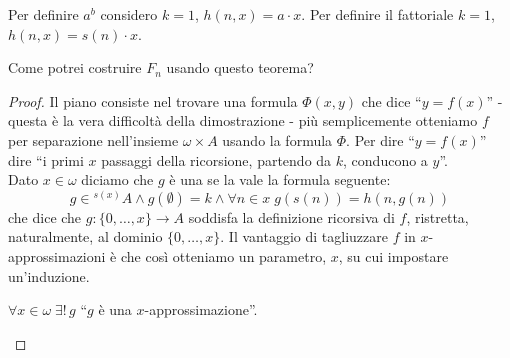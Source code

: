 \documentclass[11pt]{scrartcl}
\begin{document}
\begin{example}
	Per definire $a^b$ considero $k = 1$, $h(n,x) = a \cdot x$. Per definire il fattoriale $k = 1$, $h(n,x) = s(n) \cdot x$.
\end{example}

\begin{exercise}
	Come potrei costruire $F_n$ usando questo teorema?
\end{exercise}

\begin{proof}
	Il piano consiste nel trovare una formula $\Phi(x,y)$ che dice ``$y = f(x)$'' - questa è la vera difficoltà 
	della dimostrazione - più semplicemente otteniamo $f$ per separazione nell'insieme $\omega \times A$ usando la formula $\Phi$.
	Per dire ``$y = f(x)$'' dire ``i primi $x$ passaggi della ricorsione, partendo da $k$, conducono a $y$''.\\
	Dato $x \in \omega$ diciamo che $g$ è una  se la vale la formula seguente:
	\[ g \in {}^{s(x)}A \land g(\emptyset) = k \land \forall n \in x \; g(s(n)) = h(n,g(n))
		\]
	che dice che $g : \{0,\ldots,x\} \longrightarrow A$ soddisfa la definizione ricorsiva di $f$, ristretta, naturalmente, al dominio $\{0,\ldots,x\}$.
	Il vantaggio di tagliuzzare $f$ in $x$-approssimazioni è che così otteniamo un parametro, $x$, su cui impostare un'induzione.
	\begin{lemma}
		$\forall x \in \omega \; \exists ! \, g$ ``$g$ è una $x$-approssimazione''.
	\end{lemma}


\end{proof}
\end{document}
